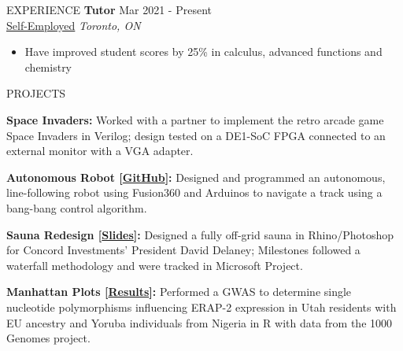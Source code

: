 \documentclass{resume}
\begin{document}
\begin{rSection}{EXPERIENCE}
\textbf{Tutor} \hfill Mar 2021 - Present \\
\href{https://www.overleaf.com/read/qybvrsfbsbwq}{Self-Employed} \hfill \textit{Toronto, ON} 
\vspace{-0.2cm}
\begin{itemize}
   \itemsep -8pt {} 
   \item  Have improved student scores by 25\% in calculus, advanced functions and chemistry 
\end{itemize}
\end{rSection} 


\begin{rSection}{PROJECTS}
\vspace{-1.25em}
\item \textbf{Space Invaders:} {Worked with a partner to implement the retro arcade game Space Invaders in Verilog; design tested on a DE1-SoC FPGA connected to an external monitor with a VGA adapter.}
\item \textbf{Autonomous Robot [\href{https://github.com/endothermiic/robot}{GitHub}]:} {Designed and programmed an autonomous, line-following robot using Fusion360 and Arduinos to navigate a track using a bang-bang control algorithm. }
\item \textbf{Sauna Redesign [\href{https://docs.google.com/presentation/d/1E1__1gkfL-J-T4yYeGk8QzZPa56Gy8qQq15TEvjyjhc/edit?usp=sharing}{Slides}]:} Designed a fully off-grid sauna in Rhino/Photoshop for Concord Investments' President David Delaney; Milestones followed a waterfall methodology and were tracked in Microsoft Project.
\item \textbf{Manhattan Plots [\href{https://my.locuszoom.org/gwas/482189/}{Results}]:} {Performed a GWAS to determine single nucleotide polymorphisms influencing ERAP-2 expression in Utah residents with EU ancestry and
Yoruba individuals from Nigeria in R with data from the 1000 Genomes project}.
\end{rSection} 
\end{document}
